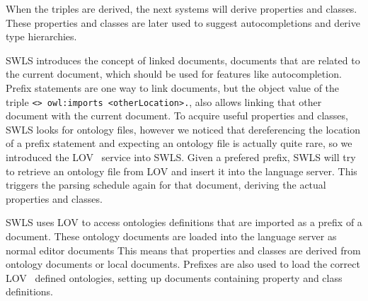 When the triples are derived, the next systems will derive properties and classes.
These properties and classes are later used to suggest autocompletions and derive type hierarchies.

SWLS introduces the concept of linked documents, documents that are related to the current document, which should be used for features like autocompletion.
Prefix statements are one way to link documents, but the object value of the triple \texttt{<> owl:imports <otherLocation>.}, also allows linking that other document with the current document.
To acquire useful properties and classes, SWLS looks for ontology files, however we noticed that dereferencing the location of a prefix statement and expecting an ontology file is actually quite rare, 
so we introduced the LOV~\cite{LOV2017} service into SWLS.
Given a prefered prefix, SWLS will try to retrieve an ontology file from LOV and insert it into the language server.
This triggers the parsing schedule again for that document, deriving the actual properties and classes.

SWLS uses LOV\cite{LOV2017} to access ontologies definitions that are imported as a prefix of a document.
These ontology documents are loaded into the language server as normal editor documents
This means that properties and classes are derived from ontology documents or local documents.
Prefixes are also used to load the correct LOV~\cite{LOV2017} defined ontologies, setting up documents containing property and class definitions.~

